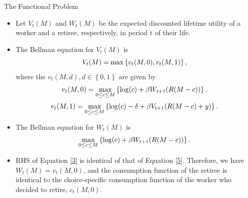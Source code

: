 \documentclass[aspectratio=169]{beamer}
\newcommand{\highlight}[1]{{\color{red}{#1}}}
\begin{document}
\begin{frame}{The Functional Problem}

	\begin{itemize}
		\item Let $V_t(M)$ and $W_t(M)$ be the expected discounted lifetime utility of a worker and a retiree, respectively, in period t of their life.
		\item The Bellman equation for $V_t(M)$ is 
		\begin{equation}\small
			\label{2}
			V_t(M)=\max \left\{v_t(M, 0), v_t(M, 1)\right\},
		\end{equation}
		where the \highlight{choice-specific value functions}  $v_t(M, d), d \in \left\{ 0, 1\right\}$ are given by 
		\begin{equation}\small
			\label{3}
			 v_t(M, 0)=\max _{0 \leq c \leq M}\left\{\log (c)+\beta W_{t+1}(R(M-c))\right\},
		\end{equation}
		\begin{equation}\small
			\label{4}
			v_t(M, 1)=\max _{0 \leq c \leq M}\left\{\log (c)-\delta+\beta V_{t+1}(R(M-c)+y)\right\} .
		\end{equation}
		\item The Bellman equation for $W_t(M)$ is 
		\begin{equation}\small
			\label{5}
			\max _{0 \leq c \leq M}\left\{\log (c)+\beta W_{t+1}(R(M-c))\right\}.
		\end{equation}
		\item RHS of Equation \ref{3} is identical of that of Equation \ref{5}. Therefore, we have $W_t(M) = v_t(M, 0)$, and the consumption function of the retiree is identical to the choice-specific consumption function of the worker who decided to retire, $c_t(M, 0)$.
	\end{itemize}

\end{frame}
\end{document}

